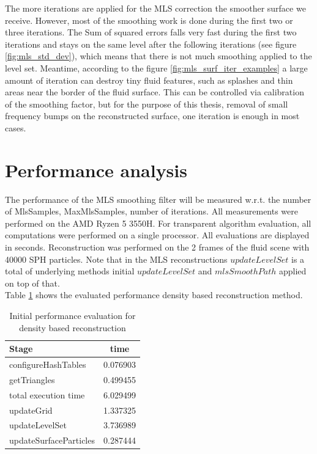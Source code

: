 The more iterations are applied for the MLS correction the smoother surface we receive. However, most of the smoothing work is done during the first two or three iterations. The Sum of squared errors falls very fast during the first two iterations and stays on the same level after the following iterations (see figure \ref{fig:mls_std_dev}), which means that there is not much smoothing applied to the level set. Meantime, according to the figure \ref{fig:mls_surf_iter_examples} a large amount of iteration can destroy tiny fluid features, such as splashes and thin areas near the border of the fluid surface. This can be controlled via calibration of the smoothing factor, but for the purpose of this thesis, removal of small frequency bumps on the reconstructed surface, one iteration is enough in most cases.

\section{Performance analysis}
The performance of the MLS smoothing filter will be measured w.r.t. the number of MlsSamples, MaxMlsSamples, number of iterations. All measurements were performed on the AMD Ryzen 5 3550H. For transparent algorithm evaluation, all computations were performed on a single processor. All evaluations are displayed in seconds. Reconstruction was performed on the 2 frames of the fluid scene with 40000 SPH particles. Note that in the MLS reconstructions $updateLevelSet$ is a total of underlying methods initial $updateLevelSet$ and $mlsSmoothPath$ applied on top of that.\\
Table \ref{tab:mls_initial_method} shows the evaluated performance density based reconstruction method.
\begin{table}[H]
	\begin{center}
		\scriptsize
		\begin{tabular}{|l|c|}
			\hline
			Stage & time \\
			\hline
				configureHashTables	&	0.076903\\
				getTriangles	&	0.499455\\
				total execution time	&	6.029499\\
				updateGrid	&	1.337325\\
				updateLevelSet	&	3.736989\\
				updateSurfaceParticles	&	0.287444\\
			\hline
		\end{tabular}
	\end{center}
	\caption{Initial performance evaluation for density based reconstruction}
	\label{tab:mls_initial_method}
\end{table}
